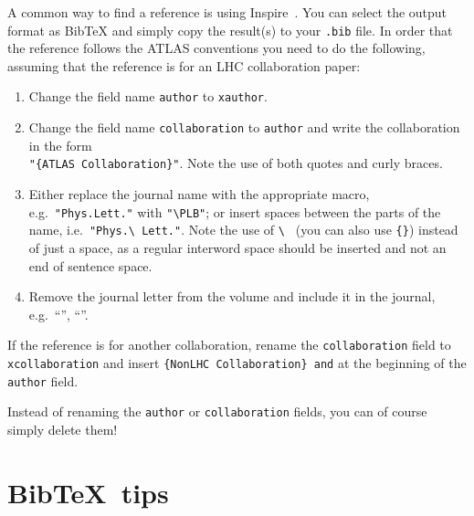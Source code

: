 \documentclass[UKenglish]{latex/atlasdoc}
\newcommand*{\BibTeX}{Bib\TeX}
\newcommand{\File}[1]{\texttt{#1}\xspace}
\begin{document}
A common way to find a reference is using Inspire~\cite{inspire}.
You can select the output format as BibTeX and simply copy the result(s) to your \File{.bib} file.
In order that the reference follows the ATLAS conventions you need to do the following,
assuming that the reference is for an LHC collaboration paper:
\begin{enumerate}
\item Change the field name \texttt{author} to \texttt{xauthor}.
\item Change the field name \texttt{collaboration} to \texttt{author} and write the collaboration in the form\\
  \verb|"{ATLAS Collaboration}"|. Note the use of both quotes and curly braces.
\item Either replace the journal name with the appropriate macro, e.g.\ \verb|"Phys.Lett."| with
  \verb|"\PLB"|; or insert spaces between the parts of the name, i.e.\ \verb|"Phys.\ Lett."|.
  Note the use of \verb|\ | (you can also use \verb|{}|) instead of just a space, 
  as a regular interword space should be inserted and not an end of sentence space.
\item Remove the journal letter from the volume and include it in the journal,
  e.g.\ \enquote{\EPJC}, \enquote{\PRD}. 
\end{enumerate}
If the reference is for another collaboration, rename the \texttt{collaboration} field to
\texttt{xcollaboration} and insert \verb|{NonLHC Collaboration} and| at the beginning of the 
\texttt{author} field.

Instead of renaming the \texttt{author} or \texttt{collaboration} fields, you can of course simply delete them!


\section{\BibTeX\ tips}
\end{document}
